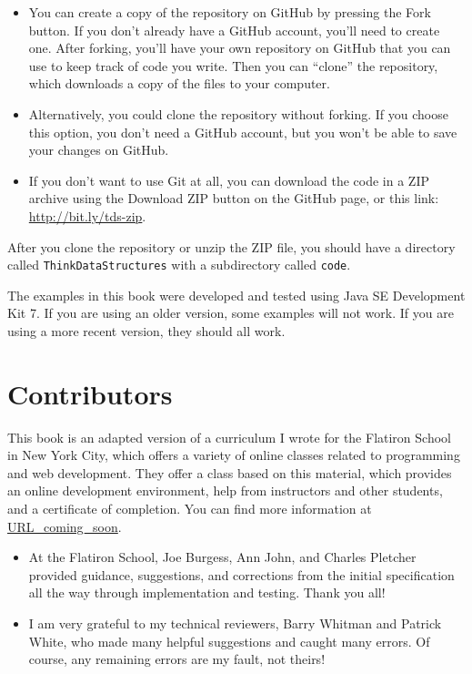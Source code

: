 \documentclass[12pt]{book}
\theoremstyle{exercise}
\begin{document}
\begin{itemize}

\item You can create a copy of the repository on GitHub by pressing
  the {\sf Fork} button.  If you don't already have a GitHub account,
  you'll need to create one.  After forking, you'll have your own
  repository on GitHub that you can use to keep track of code you
  write.  Then you can ``clone'' the repository, which downloads a
  copy of the files to your computer.

\item Alternatively, you could clone the repository without forking.
  If you choose this option, you don't need a GitHub account, but you
  won't be able to save your changes on GitHub.

\item If you don't want to use Git at all, you can download the code
  in a ZIP archive using the {\sf Download ZIP} button on the GitHub
  page, or this link: \url{http://bit.ly/tds-zip}.


\end{itemize}

After you clone the repository or unzip the ZIP file, you should have
a directory called {\tt ThinkDataStructures} with a subdirectory
called {\tt code}.

The examples in this book were developed and tested using Java SE
Development Kit 7.  If you are using an older version, some examples
will not work.  If you are using a more recent version, they should
all work.


\section*{Contributors}

This book is an adapted version of a curriculum I wrote for the
Flatiron School in New York City, which offers a variety of online
classes related to programming and web development.  They offer a
class based on this material, which provides an online development
environment, help from instructors and other students, and a
certificate of completion.  You can find more information at
\url{URL_coming_soon}.


\begin{itemize}

\item At the Flatiron School, Joe Burgess, Ann John, and Charles
Pletcher provided guidance, suggestions, and corrections from the
initial specification all the way through implementation and testing.
Thank you all!

\item I am very grateful to my technical reviewers, Barry Whitman and
  Patrick White, who made many helpful suggestions and caught many
  errors.  Of course, any remaining errors are my fault, not theirs!


\end{itemize}
\end{document}
